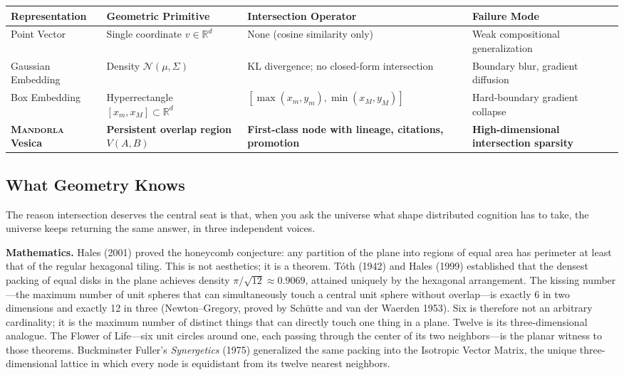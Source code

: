\documentclass[11pt,a4paper]{article}
\begin{document}
\begin{table}[h]
\centering
\small
\begin{tabular}{>{\raggedright\arraybackslash}p{2.3cm}>{\raggedright\arraybackslash}p{3.2cm}>{\raggedright\arraybackslash}p{4.5cm}>{\raggedright\arraybackslash}p{3.5cm}}
\toprule
\textbf{Representation} & \textbf{Geometric Primitive} & \textbf{Intersection Operator} & \textbf{Failure Mode} \\
\midrule
Point Vector & Single coordinate $v \in \mathbb{R}^d$ & None (cosine similarity only) & Weak compositional generalization \\
Gaussian Embedding & Density $\mathcal{N}(\mu, \Sigma)$ & KL divergence; no closed-form intersection & Boundary blur, gradient diffusion \\
Box Embedding & Hyperrectangle $[x_m, x_M] \subset \mathbb{R}^d$ & $[\max(x_m, y_m), \min(x_M, y_M)]$ & Hard-boundary gradient collapse \\
\textbf{\textsc{Mandorla} Vesica} & \textbf{Persistent overlap region $V(A, B)$} & \textbf{First-class node with lineage, citations, promotion} & \textbf{High-dimensional intersection sparsity} \\
\bottomrule
\end{tabular}
\end{table}

\subsection{What Geometry Knows}

The reason intersection deserves the central seat is that, when you ask the universe what shape distributed cognition has to take, the universe keeps returning the same answer, in three independent voices.

\textbf{Mathematics.} Hales (2001) proved the honeycomb conjecture: any partition of the plane into regions of equal area has perimeter at least that of the regular hexagonal tiling. This is not aesthetics; it is a theorem. T\'oth (1942) and Hales (1999) established that the densest packing of equal disks in the plane achieves density $\pi/\sqrt{12} \approx 0.9069$, attained uniquely by the hexagonal arrangement. The kissing number---the maximum number of unit spheres that can simultaneously touch a central unit sphere without overlap---is exactly 6 in two dimensions and exactly 12 in three (Newton--Gregory, proved by Sch\"utte and van der Waerden 1953). Six is therefore not an arbitrary cardinality; it is the maximum number of distinct things that can directly touch one thing in a plane. Twelve is its three-dimensional analogue. The Flower of Life---six unit circles around one, each passing through the center of its two neighbors---is the planar witness to those theorems. Buckminster Fuller's \emph{Synergetics} (1975) generalized the same packing into the Isotropic Vector Matrix, the unique three-dimensional lattice in which every node is equidistant from its twelve nearest neighbors.
\end{document}
